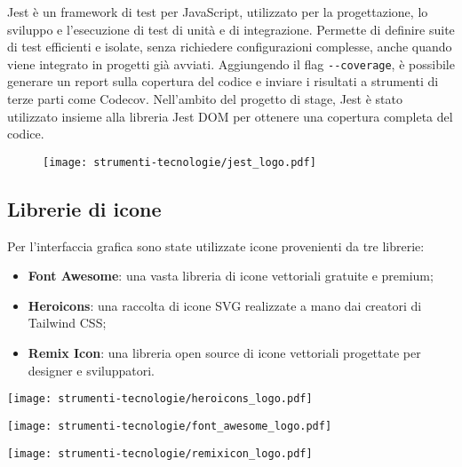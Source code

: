 \par Jest è un framework di test per JavaScript, utilizzato per la progettazione, lo sviluppo e l’esecuzione di test di unità e di integrazione. Permette di definire suite di test efficienti e isolate, senza richiedere configurazioni complesse, anche quando viene integrato in progetti già avviati. Aggiungendo il flag \verb|--coverage|, è possibile generare un report sulla copertura del codice e inviare i risultati a strumenti di terze parti come Codecov. Nell’ambito del progetto di stage, Jest è stato utilizzato insieme alla libreria Jest DOM per ottenere una copertura completa del codice.

\begin{figure}[H]
    \centering 
    \texttt{[image: strumenti-tecnologie/jest\_logo.pdf]} 
\end{figure}

\subsection*{Librerie di icone}

\par Per l’interfaccia grafica sono state utilizzate icone provenienti da tre librerie:
\begin{itemize}
  \item \textbf{Font Awesome}: una vasta libreria di icone vettoriali gratuite e premium;
  \item \textbf{Heroicons}: una raccolta di icone SVG realizzate a mano dai creatori di Tailwind CSS;
  \item \textbf{Remix Icon}: una libreria open source di icone vettoriali progettate per designer e sviluppatori.
\end{itemize}

\vspace{5pt}
\begin{center}
  \begin{minipage}{0.3\columnwidth}
    \centering
    \texttt{[image: strumenti-tecnologie/heroicons\_logo.pdf]} 
  \end{minipage}
  \hfill
  \begin{minipage}{0.3\columnwidth}
    \centering
    \texttt{[image: strumenti-tecnologie/font\_awesome\_logo.pdf]} 
  \end{minipage}
  \hfill
  \begin{minipage}{0.3\columnwidth}
    \centering
    \texttt{[image: strumenti-tecnologie/remixicon\_logo.pdf]} 
  \end{minipage}
\end{center}

